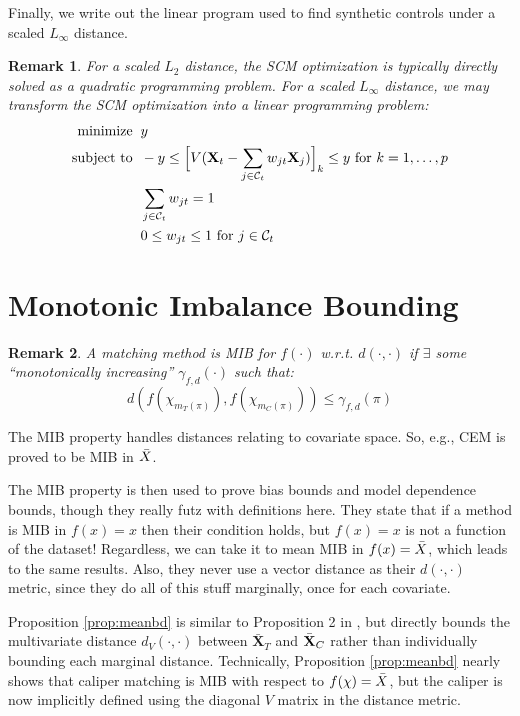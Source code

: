 \documentclass{article}
\newtheorem{remark}{Remark}
\newcommand{\bX}{\mathbf{X}}
\newcommand{\Xt}{\mathbf{X}_t}
\newcommand{\Xj}{\mathbf{X}_j}
\newcommand{\Ct}{\mathcal{C}_{t}}
\begin{document}
Finally, we write out the linear program used to find synthetic controls under a scaled $L_\infty$ distance.
\begin{remark}
\label{rem:linf_opt}
For a scaled $L_2$ distance, the SCM optimization is typically directly solved as a quadratic programming problem.
For a scaled $L_\infty$ distance, we may transform the SCM optimization into a linear programming problem:
\begin{align*}
    \text{minimize} &\hspace{2mm} y \\
    \text{subject to} &\hspace{2mm} -y \leq \Big[ V(\Xt - \sum_{j \in \Ct} w_{jt} \Xj) \Big]_k \leq y \text{ for } k = 1, \dots, p \\
    &\hspace{2mm} \sum_{j \in \Ct} w_{jt} = 1 \\
    &\hspace{2mm} 0 \leq w_{jt} \leq 1 \text{ for } j \in \Ct
\end{align*}
\end{remark}


\section{Monotonic Imbalance Bounding}
\label{app:mib}

\begin{remark}
    A matching method is MIB for $f(\cdot)$ w.r.t. $d(\cdot, \cdot)$ if $\exists$ some ``monotonically increasing'' $\gamma_{f,d}(\cdot)$  such that:
    $$d(f(\chi_{m_T(\pi)}), f(\chi_{m_C(\pi)})) \leq \gamma_{f,d}(\pi)$$
\end{remark}
The MIB property handles distances relating to covariate space.
So, e.g., CEM is proved to be MIB in $\Bar{X}$.

The MIB property is then used to prove bias bounds and model dependence bounds, though they really futz with definitions here.
They state that if a method is MIB in $f(x) = x$ then their condition holds, but $f(x)=x$ is not a function of the dataset!
Regardless, we can take it to mean MIB in $f(x) = \Bar{X}$, which leads to the same results.
Also, they never use a vector distance as their $d(\cdot, \cdot)$ metric, since they do all of this stuff marginally, once for each covariate.


Proposition \ref{prop:meanbd} is similar to Proposition 2 in \citet{iacus2011multivariate}, but directly bounds the multivariate distance $d_V(\cdot,\cdot)$ between $\bar{\bX}_T$ and $\Bar{\bX}_C$ rather than individually bounding each marginal distance.
Technically, Proposition \ref{prop:meanbd} nearly shows that caliper matching is MIB with respect to $f(\chi)=\Bar{X}$, but the caliper is now implicitly defined using the diagonal $V$ matrix in the distance metric.
\end{document}
